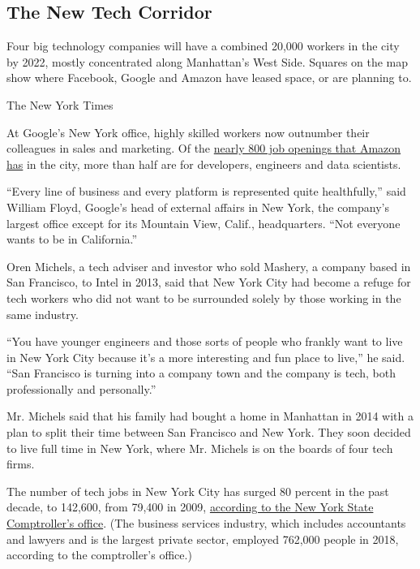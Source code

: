 \hypertarget{the-new-tech-corridor}{%
\subsection{The New Tech Corridor}\label{the-new-tech-corridor}}

Four big technology companies will have a combined 20,000 workers in the
city by 2022, mostly concentrated along Manhattan's West Side. Squares
on the map show where Facebook, Google and Amazon have leased space, or
are planning to.

The New York Times

At Google's New York office, highly skilled workers now outnumber their
colleagues in sales and marketing. Of the
\href{https://www.amazon.jobs/en/search?offset=0\&result_limit=10\&sort=relevant\&job_type=Full-Time\&cities\%5B\%5D=New\%20York\%2C\%20New\%20York\%2C\%20USA\&distanceType=Mi\&radius=24km\&latitude=40.71455\&longitude=-74.00714\&loc_group_id=\&loc_query=New\%20York\%2C\%20New\%20York\%2C\%20United\%20States\&base_query=\&city=New\%20York\&country=USA\&region=New\%20York\&county=New\%20York\&query_options=\&}{nearly
800 job openings that Amazon has} in the city, more than half are for
developers, engineers and data scientists.

``Every line of business and every platform is represented quite
healthfully,'' said William Floyd, Google's head of external affairs in
New York, the company's largest office except for its Mountain View,
Calif., headquarters. ``Not everyone wants to be in California.''

Oren Michels, a tech adviser and investor who sold Mashery, a company
based in San Francisco, to Intel in 2013, said that New York City had
become a refuge for tech workers who did not want to be surrounded
solely by those working in the same industry.

``You have younger engineers and those sorts of people who frankly want
to live in New York City because it's a more interesting and fun place
to live,'' he said. ``San Francisco is turning into a company town and
the company is tech, both professionally and personally.''

Mr. Michels said that his family had bought a home in Manhattan in 2014
with a plan to split their time between San Francisco and New York. They
soon decided to live full time in New York, where Mr. Michels is on the
boards of four tech firms.

The number of tech jobs in New York City has surged 80 percent in the
past decade, to 142,600, from 79,400 in 2009,
\href{https://www.osc.state.ny.us/osdc/rpt1-2020.pdf}{according to the
New York State Comptroller's office}. (The business services industry,
which includes accountants and lawyers and is the largest private
sector, employed 762,000 people in 2018, according to the comptroller's
office.)


